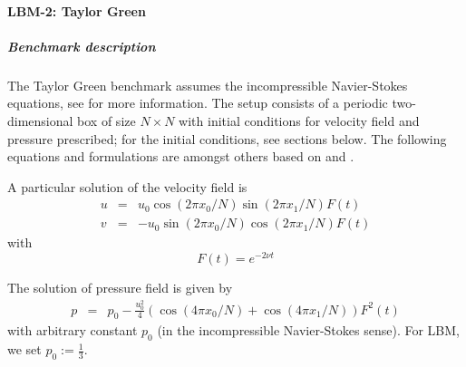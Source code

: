 

\paragraph{LBM-2: Taylor Green}



\subparagraph{Benchmark description}

The Taylor Green benchmark assumes the incompressible Navier-Stokes equations, see \cite{taylor1937mechanism} for more information.
The setup consists of a periodic two-dimensional box of size $N \times N$ with initial conditions for velocity field and pressure prescribed; for the initial conditions, see sections below.
The following equations and formulations are amongst others based on \cite{wikiTaylorGreen} and \cite{taylor1937mechanism}.


A particular solution of the velocity field is
\begin{eqnarray}
	u &=& u_0\cos \left(2\pi x_0/N\right) \sin \left(2\pi x_1/N\right) F(t)\\
	v &=& -u_0\sin \left(2\pi x_0/N\right) \cos \left(2\pi x_1/N\right) F(t)
\end{eqnarray}
with
$$
	F(t) = e^{-2\nu t}
$$

The solution of pressure field is given by
\begin{eqnarray}
	p &=& p_0-\frac{u_0^2}{4} \left( \cos \left(4\pi x_0/N\right) + \cos \left(4\pi x_1/N\right) \right) F^2(t)
\end{eqnarray}
with arbitrary constant $p_0$ (in the incompressible Navier-Stokes sense).
For LBM, we set $p_0:=\frac{1}{3}$.


